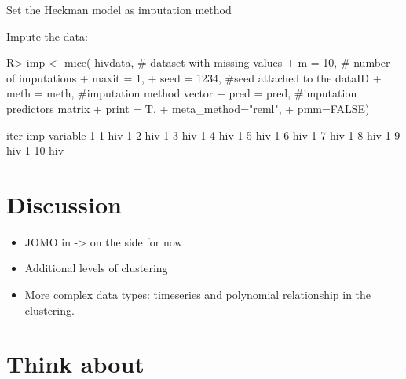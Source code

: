 \documentclass[
]{jss}
\begin{document}
Set the Heckman model as imputation method

\begin{CodeChunk}
\end{CodeChunk}

Impute the data:

\begin{CodeChunk}
\begin{CodeInput}
R> imp <- mice( hivdata, # dataset with missing values
+                         m = 10,   # number of imputations
+                         maxit = 1,
+                         seed = 1234, #seed attached to the dataID
+                         meth = meth, #imputation method vector
+                         pred = pred, #imputation predictors matrix
+                         print = T,
+                         meta_method="reml",
+                         pmm=FALSE)
\end{CodeInput}
\begin{CodeOutput}

 iter imp variable
  1   1  hiv
  1   2  hiv
  1   3  hiv
  1   4  hiv
  1   5  hiv
  1   6  hiv
  1   7  hiv
  1   8  hiv
  1   9  hiv
  1   10  hiv
\end{CodeOutput}
\end{CodeChunk}

\hypertarget{discussion}{%
\section{Discussion}\label{discussion}}

\begin{itemize}
\item
  JOMO in  -\textgreater{} on the side for now
\item
  Additional levels of clustering
\item
  More complex data types: timeseries and polynomial relationship in the
  clustering.
\end{itemize}

\hypertarget{think-about}{%
\section{Think about}\label{think-about}}
\end{document}
